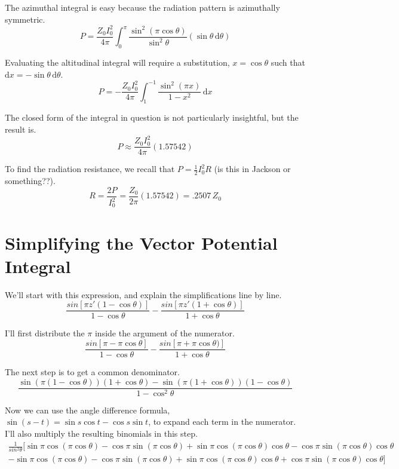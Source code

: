 \documentclass[10pt,a4paper]{article}
\begin{document}
The azimuthal integral is easy because the radiation pattern is azimuthally symmetric.
\begin{equation}
P=\frac{Z_0I_0^2}{4\pi}\int_0^\pi
\frac{\sin^2(\pi\cos\theta)}{\sin^2\theta}
(\sin\theta\, \mathrm{d}\theta)
\end{equation}

Evaluating the altitudinal integral will require a substitution, $x=\cos\theta$ such that $\mathrm{d}x=-\sin\theta\,\mathrm{d}\theta$.
\begin{equation}
P=-\frac{Z_0I_0^2}{4\pi}\int_1^{-1}
\frac{\sin^2(\pi x)}{1-x^2}
\, \mathrm{d}x
\end{equation}

The closed form of the integral in question is not particularly insightful, but the result is.
\begin{equation}
P\approx\frac{Z_0I_0^2}{4\pi}(1.57542)
\end{equation}

To find the radiation resistance, we recall that $P=\frac{1}{2}I_0^2R$ (is this in Jackson or something??).
\begin{equation}
R=\frac{2P}{I_0^2}=\frac{Z_0}{2\pi}(1.57542)=.2507\,Z_0
\end{equation}


\appendix
\section{Simplifying the Vector Potential Integral}
We'll start with this expression, and explain the simplifications line by line.
\begin{equation}
\frac{sin[\pi z'(1-\cos\theta)]}{1-\cos\theta}-\frac{sin[\pi z'(1+\cos\theta)]}{1+\cos\theta}
\end{equation}

I'll first distribute the $\pi$ inside the argument of the numerator.
\begin{equation}
\frac{sin[\pi-\pi\cos\theta]}{1-\cos\theta}-\frac{sin[\pi+\pi\cos\theta)]}{1+\cos\theta}
\end{equation}

The next step is to get a common denominator.
\begin{equation}
\frac{
\sin(\pi(1-\cos\theta))(1+\cos\theta)-\sin(\pi(1+\cos\theta))(1-\cos\theta)
}{1-\cos^2\theta}
\end{equation}


Now we can use the angle difference formula, $\sin(s-t) = \sin s \cos t - \cos s \sin t$, to expand each term in the numerator. I'll also multiply the resulting binomials in this step.
\begin{multline}
\frac{1}{sin^2\theta}[
\sin\pi\cos(\pi\cos\theta)
-\cos\pi\sin(\pi\cos\theta)
+\sin\pi\cos(\pi\cos\theta)\cos\theta
-\cos\pi\sin(\pi\cos\theta)\cos\theta \\
-\sin\pi\cos(\pi\cos\theta)
-\cos\pi\sin(\pi\cos\theta)
+\sin\pi\cos(\pi\cos\theta)\cos\theta
+\cos\pi\sin(\pi\cos\theta)\cos\theta
]
\end{multline}
\end{document}
